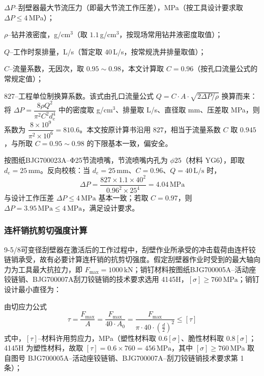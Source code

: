 $\Delta P$--刮壁器最大节流压力（即最大节流工作压差），MPa（按工具设计要求取 $\Delta P \le 4$\,MPa）；

$\rho$--钻井液密度，g/cm$^3$（取 $1.1$\,g/cm$^3$，按现场常用钻井液密度取值）；

$Q$--工作时泵排量，L/s（暂定取 $40$\,L/s，按常规洗井排量取值）；

$C$--流量系数，无因次，取 $0.95 \sim 0.98$，本文计算取 $C = 0.96$（按孔口流量公式的常规定值）；

$827$--工程单位制换算系数。该式由孔口流量公式 $Q = C \cdot A \cdot \sqrt{2\Delta P/\rho}$ 换算而来：将 $\Delta P = \dfrac{8\rho Q^2}{\pi^2 C^2 d_e^4}$ 中的密度取 g/cm$^3$、排量取 L/s、直径取 mm、压差取 MPa，则系数为 $\dfrac{8\times 10^{9}}{\pi^2\times 10^{6}} = 810.6$。本文按原计算书沿用 $827$，相当于流量系数 $C$ 取 $0.945$，与所取 $C = 0.95\sim0.98$ 的下限基本一致，偏安全。

按图纸BJG700023A--Φ25节流喷嘴，节流喷嘴内孔为 $\phi 25$（材料 YG6），即取 $d_e = 25\,\mathrm{mm}$。反向校核：当 $d_e = 25\,\mathrm{mm}$、$C = 0.96$、$Q = 40\,\mathrm{L/s}$ 时，
\begin{equation}
    \Delta P = \frac{827 \times 1.1 \times 40^2}{0.96^2 \times 25^4} = 4.04\,\mathrm{MPa}
\end{equation}
与设计工作压差 $\Delta P \le 4\,\mathrm{MPa}$ 基本一致；若取 $C = 0.97$，则 $\Delta P = 3.95\,\mathrm{MPa} \le 4\,\mathrm{MPa}$，满足设计要求。


\subsubsection{连杆销抗剪切强度计算}

9-5/8\inch 可变径刮壁器在激活后的工作过程中，刮壁作业所承受的冲击载荷由连杆铰链销承受，故有必要计算连杆销的抗剪切强度。假定刮壁器作业时受到的最大轴向力为工具最大抗拉力，即 $F_{\max} = 1000\,\mathrm{kN}$；销钉材料按图纸BJG700005A--活动座铰链销、BJG700007A刮刀铰链销的技术要求选用 4145H，$[\sigma] \ge 760\,\mathrm{MPa}$；销钉设计最小直径为：

由切应力公式
\begin{equation}
    \tau = \frac{F_{\max}}{A} = \frac{F_{\max}}{40 \cdot A_0} = \frac{F_{\max}}{\pi \cdot 40 \cdot \left(\frac{d}{2}\right)^2} \le [\tau]
\end{equation}
式中，$[\tau]$--材料许用剪应力，MPa（塑性材料取 $0.6[\sigma]$、脆性材料取 $0.8[\sigma]$；4145H 为塑性材料，故取 $[\tau] = 0.6 \times 760 = 456\,\mathrm{MPa}$，其中 $[\sigma] \ge 760$\,MPa 取自图号 BJG700005A--活动座铰链销、BJG700007A--刮刀铰链销技术要求第 1 条）；

